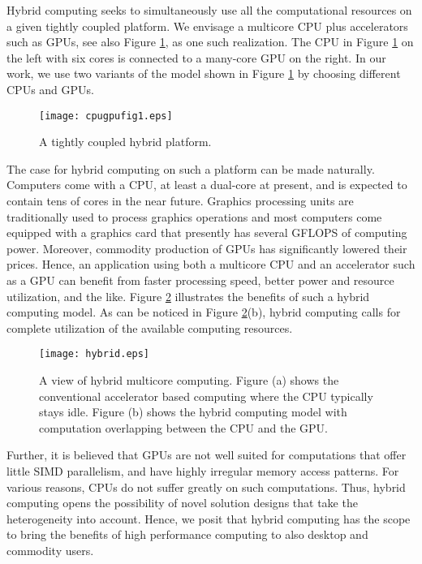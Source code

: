 \documentclass[11pt]{article}
\begin{document}
Hybrid computing seeks to
simultaneously use all the computational resources on a given
tightly coupled platform. We envisage a multicore CPU plus accelerators 
such as GPUs, see also Figure \ref{fig:cpugpu}, as one such realization. 
The CPU in Figure \ref{fig:cpugpu} on the left with six cores is
connected to a many-core GPU on the right. In our work, we use two
variants of the model shown in Figure \ref{fig:cpugpu} by choosing 
different CPUs and GPUs.

\begin{figure}
\centering
\texttt{[image: cpugpufig1.eps]}
\caption{A tightly coupled hybrid platform.}
\label{fig:cpugpu}
\end{figure}


The case for hybrid computing on such a platform can be made naturally. 
Computers come with a CPU, at least a dual-core at present, and is expected
to contain tens of cores in the near future. Graphics processing
units are traditionally used to process graphics operations
and most computers come equipped with a graphics card that presently
has several GFLOPS of computing power. Moreover, commodity production
of GPUs has significantly lowered their prices. Hence, an application using both a
multicore CPU and an accelerator such as a GPU can benefit from
faster processing speed, better power and resource utilization, and
the like.  Figure \ref{fig:hybrid} illustrates the benefits of
such a hybrid computing
model. As can be noticed in Figure \ref{fig:hybrid}(b), hybrid computing
calls for complete utilization of the available computing resources.

\begin{figure}[htp]
  \begin{center}
    \texttt{[image: hybrid.eps]}
  \end{center}
  \caption{A view of hybrid multicore computing. Figure (a) shows the
  conventional accelerator based computing where the CPU typically stays
  idle. Figure (b) shows the hybrid computing model with computation
 overlapping between the CPU and the GPU.}
  \label{fig:hybrid}
\end{figure}


Further, it is believed that GPUs are not well suited for computations
that offer little SIMD parallelism, and have highly irregular memory
access patterns. For various reasons, CPUs do not suffer greatly on such
computations. Thus, hybrid computing opens the possibility of novel
solution designs that take the heterogeneity into account. Hence, we
posit that hybrid computing has the scope to bring the benefits of
high performance computing to also desktop and commodity users.
\end{document}
